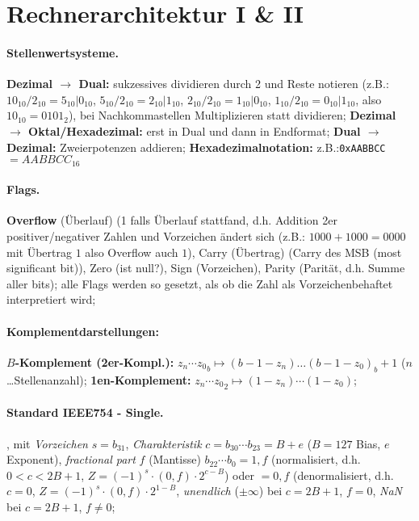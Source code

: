 \documentclass[8pt,a4paper]{article}
\begin{document}
\section*{Rechnerarchitektur I \& II}
\footnotesize
\begin{multicols}{2}
\paragraph{Stellenwertsysteme.}
\textbf{Dezimal $\rightarrow$ Dual:} sukzessives dividieren durch 2
und Reste notieren (z.B.: $10_{10}/2_{10}=5_{10}|0_{10}$,
$5_{10}/2_{10}=2_{10}|1_{10}$, $2_{10}/2_{10}=1_{10}|0_{10}$,
$1_{10}/2_{10}=0_{10}|1_{10}$, also $10_{10}=0101_{2}$), bei
Nachkommastellen Multiplizieren statt dividieren;
\textbf{Dezimal $\rightarrow$ Oktal/Hexadezimal:} erst in Dual und dann
in Endformat; \textbf{Dual $\rightarrow$ Dezimal:} Zweierpotenzen
addieren; \textbf{Hexadezimalnotation:} z.B.:\texttt{0xAABBCC}$=AABBCC_{16}$

\paragraph{Flags.} \textbf{Overflow} (Überlauf) (1 falls Überlauf stattfand, d.h. Addition 2er positiver/negativer Zahlen und Vorzeichen ändert sich (z.B.: $1000+1000=0000$ mit Übertrag $1$ also Overflow auch $1$), Carry (Übertrag) (Carry des MSB (most significant bit)), Zero (ist null?), Sign (Vorzeichen), Parity (Parität, d.h. Summe aller bits); alle Flags werden so gesetzt, als ob die Zahl als Vorzeichenbehaftet interpretiert wird;

\paragraph{Komplementdarstellungen:} \textbf{$B$-Komplement
  (2er-Kompl.):} ${z_n\cdots z_0}_b\mapsto
{(b-1-z_n)\ldots(b-1-z_0)}_b+1$ ($n$ \ldots Stellenanzahl); \textbf{1en-Komplement:}
${z_n\cdots z_0}_2\mapsto (1-z_n)\cdots(1-z_0)$;

\paragraph{Standard IEEE754 - Single.} , mit
\emph{Vorzeichen} $s=b_{31}$, \emph{Charakteristik} $c=b_{30}\cdots
b_{23}= B+e$ ($B=127$ Bias, $e$ Exponent), \emph{fractional part} $f$
(Mantisse) $b_{22}\cdots b_0=1,f$ (normalisiert, d.h. $0<c<2B+1$, $Z=(-1)^s\cdot(0,f)\cdot 2^{c-B}$) oder
$=0,f$ (denormalisiert, d.h. $c=0$, $Z=(-1)^s\cdot(0,f)\cdot 2^{1-B}$,
\emph{unendlich} ($\pm\infty$) bei $c=2B+1$, $f=0$, \emph{NaN} bei
$c=2B+1$, $f\neq 0$;


\end{multicols}
\end{document}
